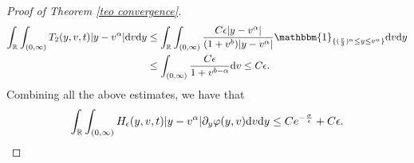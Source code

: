 \documentclass[11pt]{article}
\numberwithin{equation}{section}
\newcommand{\der}{\textup{d}}
\begin{document}
\begin{proof}[Proof of Theorem \ref{teo convergence}]
\begin{align*}
    \int_{\mathbb{R}}\int_{(0,\infty)}T_{2}(y,v,t)|y-v^{\alpha}|\der v \der y &\leq  \int_{\mathbb{R}}\int_{(0,\infty)}\frac{C\epsilon|y-v^{\alpha}|}{(1+v^{b})|y-v^{\alpha}|}\mathbbm{1}_{\{(\frac{v}{3})^{\alpha}\leq y\leq v^{\alpha}\}}\der v\der y\\
    &\leq \int_{(0,\infty)}\frac{C \epsilon}{1+v^{b-\alpha}}\der v\leq C\epsilon.
\end{align*}
Combining all the above estimates, we have that
\begin{align}\label{estimates for the transport term}
     \int_{\mathbb{R}}\int_{(0,\infty)}H_{\epsilon}(y,v,t)|y-v^{\alpha}|\partial_{y}\varphi(y,v)\der v \der y\leq C e^{-\frac{\sigma}{\epsilon}}+C\epsilon.
\end{align}


\end{proof}
\end{document}
